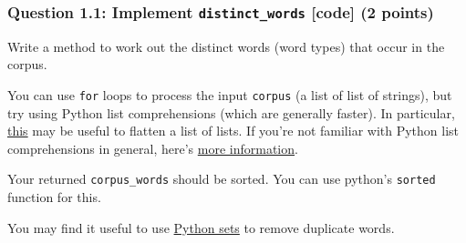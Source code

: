 \documentclass[11pt]{article}
\begin{document}
    \subsubsection{\texorpdfstring{Question 1.1: Implement
\texttt{distinct\_words} {[}code{]} (2
points)}{Question 1.1: Implement distinct\_words {[}code{]} (2 points)}}\label{question-1.1-implement-distinct_words-code-2-points}

Write a method to work out the distinct words (word types) that occur in
the corpus.

You can use \texttt{for} loops to process the input \texttt{corpus} (a
list of list of strings), but try using Python list comprehensions
(which are generally faster). In particular,
\href{https://coderwall.com/p/rcmaea/flatten-a-list-of-lists-in-one-line-in-python}{this}
may be useful to flatten a list of lists. If you're not familiar with
Python list comprehensions in general, here's
\href{https://python-3-patterns-idioms-test.readthedocs.io/en/latest/Comprehensions.html}{more
information}.

Your returned \texttt{corpus\_words} should be sorted. You can use
python's \texttt{sorted} function for this.

You may find it useful to use
\href{https://www.w3schools.com/python/python_sets.asp}{Python sets} to
remove duplicate words.
\end{document}
